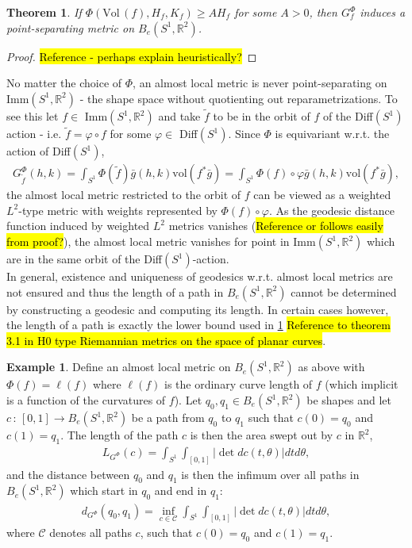 \documentclass[a4,danish]{article}
\theoremstyle{break}
\newtheorem{theorem}[subsection]{Theorem}
\theoremstyle{definition}
\theoremstyle{Break}
\newtheorem{example}[subsection]{Example}
\newcommand{\R}{\mathbb{R}}
\renewcommand{\phi}{\varphi}
\begin{document}
\begin{theorem}\label{point_sep}
If $\Phi(\text{Vol} \, (f), H_f, K_f) \geq A H_f$ for some $A > 0$, then $G_f^\Phi$ induces a point-separating metric on $B_e(S^1, \R^2)$.
\end{theorem}

\begin{proof}
\hl{Reference - perhaps explain heuristically?}
\end{proof}

No matter the choice of $\Phi$, an almost local metric is never point-separating on Imm$(S^1, \R^2)$ - the shape space without quotienting out reparametrizations. To see this let $f \in$ Imm$(S^1, \R^2)$ and take $\tilde{f}$ to be in the orbit of $f$ of the Diff$(S^1)$ action - i.e. $\tilde{f} = \phi \circ f$ for some $\phi \in$ Diff$(S^1)$. Since $\Phi$ is equivariant w.r.t. the action of Diff$(S^1)$, 
\begin{align*}
G_{\tilde{f}}^\Phi (h,k) = \int_{S^1} \Phi(\tilde{f}) \bar{g}(h,k) \text{vol}(f^* \bar{g}) = \int_{S^1} \Phi(f) \circ \phi \bar{g}(h,k) \text{vol}(f^* \bar{g}),
\end{align*}
the almost local metric restricted to the orbit of $f$ can be viewed as a weighted $L^2$-type metric with weights represented by $\Phi(f) \circ \phi$. As the geodesic distance function induced by weighted $L^2$ metrics vanishes (\hl{Reference or follows easily from proof?}), the almost local metric vanishes for point in Imm$(S^1, \R^2)$ which are in the same orbit of the Diff$(S^1)$-action.
\\[0.2 cm]
In general, existence and uniqueness of geodesics w.r.t. almost local metrics are not ensured and thus the length of a path in $B_e(S^1,\R^2)$ cannot be determined by constructing a geodesic and computing its length. In certain cases however, the length of a path is exactly the lower bound used in \ref{point_sep} \hl{Reference to theorem 3.1 in H0 type Riemannian metrics on the space of planar curves}.

\begin{example}
Define an almost local metric on $B_e(S^1, \R^2)$ as above with $\Phi(f) = \ell(f)$ where $\ell(f)$ is the ordinary curve length of $f$ (which implicit is a function of the curvatures of $f$). Let $q_0, q_1 \in B_e(S^1, \R^2)$ be shapes and let $c \, : \, [0,1] \rightarrow B_e(S^1, \R^2)$ be a path from $q_0$ to $q_1$ such that $c(0) = q_0$ and $c(1) = q_1$. The length of the path $c$ is then the area swept out by $c$ in $\R^2$,
\begin{align*}
L_{G^\Phi}(c) = \int_{S^1} \int_{[0,1]} \left| \det dc(t, \theta) \right| dt d\theta,
\end{align*}
and the distance between $q_0$ and $q_1$ is then the infimum over all paths in $B_e(S^1, \R^2)$ which start in $q_0$ and end in $q_1$:
\begin{align*}
d_{G^\Phi}(q_0, q_1) = \inf_{c\in\mathcal{C}} \int_{S^1} \int_{[0,1]} \left| \det dc(t, \theta) \right| dt d\theta,
\end{align*}
where $\mathcal{C}$ denotes all paths $c$, such that $c(0) =q_0$ and $c(1) =q_1$. \\[0.2 cm]
\end{example}
\end{document}
